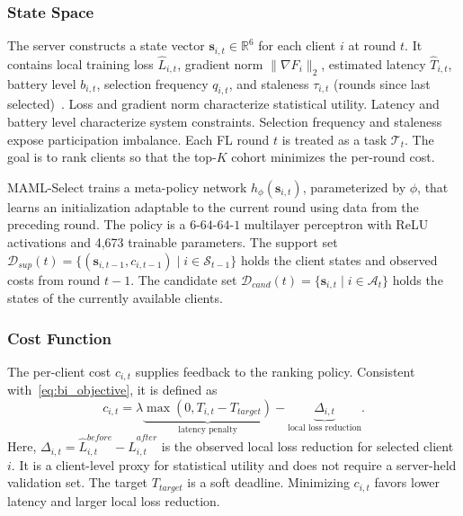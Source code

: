 \documentclass[journal]{IEEEtran}
\newcommand{\revision}[1]{#1}
\begin{document}
\subsubsection{State Space}
\revision{The server constructs a state vector $\bm{s}_{i,t} \in \mathbb{R}^6$ for each client $i$ at round $t$. It contains local training loss $\hat{L}_{i,t}$, gradient norm $\|\nabla F_i\|_2$, estimated latency $\hat{T}_{i,t}$, battery level $b_{i,t}$, selection frequency $q_{i,t}$, and staleness $\tau_{i,t}$ (rounds since last selected)}~\cite{pan2024contextual,xu2024federated}. \revision{Loss and gradient norm characterize statistical utility. Latency and battery level characterize system constraints. Selection frequency and staleness expose participation imbalance. Each FL round $t$ is treated as a task $\mathcal{T}_t$. The goal is to rank clients so that the top-$K$ cohort minimizes the per-round cost.}

MAML-Select trains a meta-policy network $h_\phi(\bm{s}_{i,t})$, parameterized by $\phi$, that learns an initialization adaptable to the current round using data from the preceding round. \revision{The policy is a $6$-$64$-$64$-$1$ multilayer perceptron with ReLU activations and 4,673 trainable parameters.} The support set $\mathcal{D}_{sup}(t) = \{(\bm{s}_{i,t-1}, c_{i,t-1}) \mid i \in \revision{\mathcal{S}_{t-1}}\}$ holds the client states and observed costs from round $t-1$. \revision{The candidate set $\mathcal{D}_{cand}(t) = \{\bm{s}_{i,t} \mid i \in \mathcal{A}_t\}$ holds the states of the currently available clients.}

\subsubsection{Cost Function}
\revision{The per-client cost $c_{i,t}$ supplies feedback to the ranking policy. Consistent with~\eqref{eq:bi_objective}, it is defined as}
\begin{equation}
	c_{i,t} = \lambda \underbrace{\max(0, T_{i,t} - T_{target})}_{\text{latency penalty}} - \underbrace{\Delta_{i,t}}_{\text{local loss reduction}}.
	\label{eq:cost}
\end{equation}
\revision{Here, $\Delta_{i,t}=\hat{L}_{i,t}^{before}-\hat{L}_{i,t}^{after}$ is the observed local loss reduction for selected client $i$. It is a client-level proxy for statistical utility and does not require a server-held validation set. The target $T_{target}$ is a soft deadline. Minimizing $c_{i,t}$ favors lower latency and larger local loss reduction.}
\end{document}
